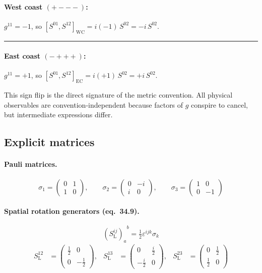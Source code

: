 \documentclass[12pt]{article}
\begin{document}
\paragraph{West coast $(+{-}{-}{-})$:} $g^{11}=-1$, so
$[S^{01},S^{12}]_{\mathrm{WC}} = i(-1)\,S^{02} = -i\,S^{02}$.

\medskip\noindent\rule{\linewidth}{0.4pt}\medskip

\paragraph{East coast $(-{+}{+}{+})$:} $g^{11}=+1$, so
$[S^{01},S^{12}]_{\mathrm{EC}} = i(+1)\,S^{02} = +i\,S^{02}$.

\medskip

\noindent This sign flip is the direct signature of the metric convention.
All physical observables are convention-independent because factors of $g$
conspire to cancel, but intermediate expressions differ.

\subsection{Explicit matrices}

\paragraph{Pauli matrices.}
\begin{equation}
  \sigma_1 = \begin{pmatrix}0 & 1 \\ 1 & 0\end{pmatrix},\qquad
  \sigma_2 = \begin{pmatrix}0 & -i \\ i & 0\end{pmatrix},\qquad
  \sigma_3 = \begin{pmatrix}1 & 0 \\ 0 & -1\end{pmatrix}
  \tag{34.8}
\end{equation}

\paragraph{Spatial rotation generators (eq.~34.9).}
\begin{equation}
  {(S^{ij}_{\mathrm{L}})_a}^b = \tfrac{1}{2}\varepsilon^{ijk}\sigma_k
  \tag{34.9}
\end{equation}
\begin{align*}
  S^{12}_{\mathrm{L}} &= \begin{pmatrix}\tfrac{1}{2} & 0 \\ 0 & -\tfrac{1}{2}\end{pmatrix},&
  S^{13}_{\mathrm{L}} &= \begin{pmatrix}0 & \tfrac{i}{2} \\ -\tfrac{i}{2} & 0\end{pmatrix},&
  S^{23}_{\mathrm{L}} &= \begin{pmatrix}0 & \tfrac{1}{2} \\ \tfrac{1}{2} & 0\end{pmatrix}
\end{align*}
\end{document}
